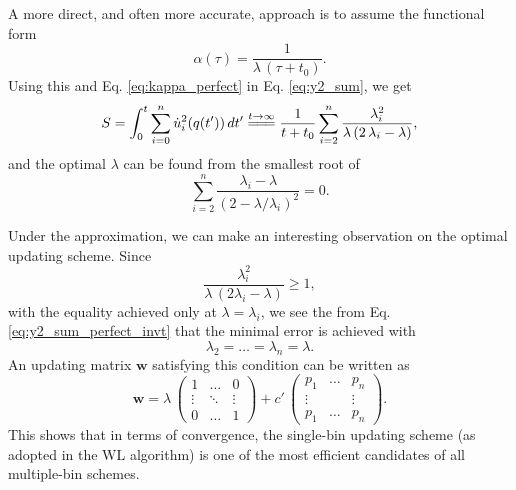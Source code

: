 \documentclass[reprint]{revtex4-1}
\begin{document}
A more direct, and often more accurate, approach
is to assume the functional form
$$
\alpha(\tau) = \frac{1}{\lambda \, (\tau + t_0) }.
$$
Using this and Eq. \eqref{eq:kappa_perfect}
in Eq. \eqref{eq:y2_sum}, we get
%
\begin{equation}
S
=
\int_0^t
\sum_{i=0}^n \dot u_i^2(q(t')) \, dt'
\stackrel{t \to \infty}
{=\joinrel=\joinrel=}
\frac{1}{t+t_0}
\sum_{i = 2}^n
\frac{ \lambda_i^2 } { \lambda \, (2 \, \lambda_i - \lambda) },
\label{eq:y2_sum_perfect_invt}
\end{equation}
%
and the optimal $\lambda$
can be found from the smallest root of
%
\begin{equation}
\sum_{i = 2}^n
\frac{ \lambda_i - \lambda }
{ \left(2 - \lambda/ \lambda_i \right)^2 }
= 0.
\end{equation}



Under the approximation, we can make an interesting observation
on the optimal updating scheme.
%
Since
$$
\frac{ \lambda_i^2 }{ \lambda \, (2 \lambda_i - \lambda) } \ge 1,
$$
with the equality achieved only at $\lambda = \lambda_i$,
we see the from Eq. \eqref{eq:y2_sum_perfect_invt}
that the minimal error is achieved with
\begin{equation}
  \lambda_2 = \dots = \lambda_n = \lambda.
\end{equation}
%
An updating matrix $\mathbf w$ satisfying this condition
can be written as
$$
\mathbf w
=
\lambda \,
\left(
\begin{array}{ccccc}
  1 & \dots & 0 \\
  \vdots &\ddots & \vdots \\
  0 & \dots & 1
\end{array}
\right)
+
c' \,
\left(
\begin{array}{ccccc}
  p_1 & \dots & p_n \\
  \vdots & & \vdots \\
  p_1 & \dots & p_n
\end{array}
\right).
$$
%
This shows that in terms of convergence,
the single-bin updating scheme
(as adopted in the WL algorithm)
is one of the most efficient candidates
of all multiple-bin schemes.
\end{document}
